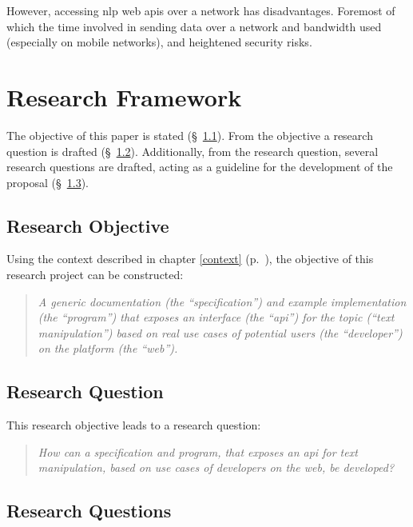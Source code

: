 However, accessing \gls{nlp} web \glspl{api} over a network has
  disadvantages.
Foremost of which the time involved in sending data over a network and
  bandwidth used (especially on mobile networks), and heightened security
  risks.

\chapter{Research Framework}\label{research-framework}

The objective of this paper is stated (§~\ref{research-objective}).
From the objective a research question is drafted
  (§~\ref{research-question}).
Additionally, from the research question, several research questions are
  drafted, acting as a guideline for the development of the proposal
  (§~\ref{research-questions}).

\section{Research Objective}\label{research-objective}

Using the context described in chapter \ref{context} (p.~\pageref{context}),
  the objective of this research project can be constructed:

\begin{quote}
  \textit{A generic documentation (the ``specification'') and example
    implementation (the ``program'') that exposes an interface (the
    ``\acrshort{api}'') for the topic (``text manipulation'') based on real
    use cases of potential users (the ``developer'') on the platform (the
    ``web'').
  }
\end{quote}

\section{Research Question}\label{research-question}

This research objective leads to a research question:

\begin{quote}
  \textit{How can a specification and program, that exposes an \acrshort{api}
    for text manipulation, based on use cases of developers on the web,
    be developed?
  }
\end{quote}

\section{Research Questions}\label{research-questions}

